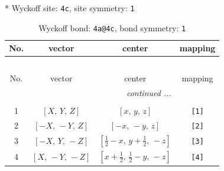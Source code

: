 \documentclass[fleqn,8pt]{jsarticle}
\begin{document}
* Wyckoff site: {\tt 4c}, site symmetry: {\tt 1}
\renewcommand{\arraystretch}{1.2}
\begin{longtable}{cccc}
\caption{Wyckoff bond: {\tt 4a@4c}, bond symmetry: {\tt 1}}
 \\
 \hline \hline
No. & vector & center & mapping \\ \hline \endfirsthead

\multicolumn{3}{l}{\tablename\ \thetable{}} \\
 \hline \hline
No. & vector & center & mapping \\ \hline \endhead

 \hline \hline
\multicolumn{3}{r}{\footnotesize\it continued ...} \\ \endfoot

 \hline \hline
\multicolumn{3}{r}{} \\ \endlastfoot

1 & $\left[ X,\, Y,\, Z \right]$ & $\left[ x,\, y,\, z \right]$ & {\tt [1]} \\ \hline
2 & $\left[ - X,\, - Y,\, Z \right]$ & $\left[ - x,\, - y,\, z \right]$ & {\tt [2]} \\ \hline
3 & $\left[ - X,\, Y,\, - Z \right]$ & $\left[ \frac{1}{2} - x,\, y + \frac{1}{2},\, - z \right]$ & {\tt [3]} \\ \hline
4 & $\left[ X,\, - Y,\, - Z \right]$ & $\left[ x + \frac{1}{2},\, \frac{1}{2} - y,\, - z \right]$ & {\tt [4]} \\
\end{longtable}
\end{document}
